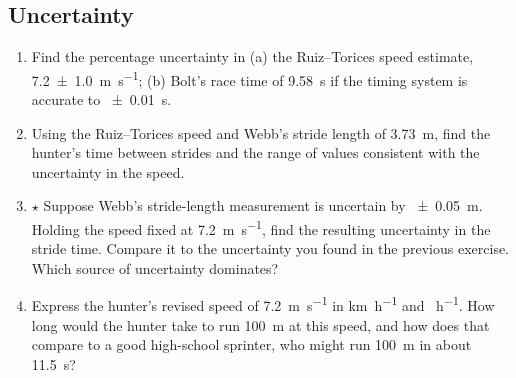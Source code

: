 \documentclass[11pt,twoside,openany]{book}
\begin{document}
\subsection*{Uncertainty}
\begin{enumerate}[label=\textbf{\thechapter.\arabic*},resume=exercises,leftmargin=*]
  \item Find the percentage uncertainty in (a) the Ruiz--Torices speed estimate, \SI{7.2 \pm 1.0}{\metre\per\second}; (b) Bolt's race time of \SI{9.58}{\second} if the timing system is accurate to \SI{\pm 0.01}{\second}.
  \item Using the Ruiz--Torices speed and Webb's stride length of \SI{3.73}{\metre}, find the hunter's time between strides and the range of values consistent with the uncertainty in the speed.
  \item $\star$ Suppose Webb's stride-length measurement is uncertain by \SI{\pm 0.05}{\metre}. Holding the speed fixed at \SI{7.2}{\metre\per\second}, find the resulting uncertainty in the stride time. Compare it to the uncertainty you found in the previous exercise. Which source of uncertainty dominates?
  \item Express the hunter's revised speed of \SI{7.2}{\metre\per\second} in \si{\kilo\metre\per\hour} and \si{\mile\per\hour}. How long would the hunter take to run \SI{100}{\metre} at this speed, and how does that compare to a good high-school sprinter, who might run \SI{100}{\metre} in about \SI{11.5}{\second}?
\end{enumerate}
\end{document}

